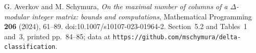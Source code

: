 G. Averkov and M. Schymura,
\emph{On the maximal number of columns of a $\Delta$-modular integer
matrix: bounds and computations},
Mathematical Programming \textbf{206} (2024), 61--89.
doi:10.1007/s10107-023-01964-2.
Section~5.2 and Tables~1 and~3, printed pp.~84--85;
data at \texttt{https://github.com/mschymura/delta-classification}.

